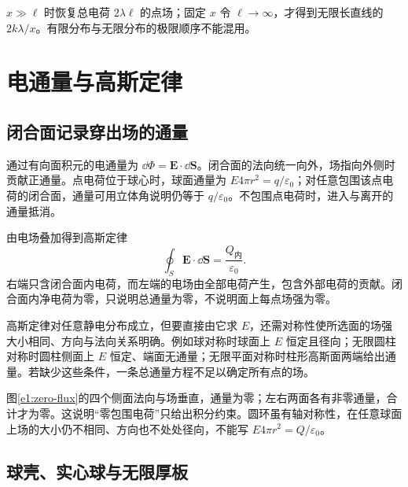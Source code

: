 $x\gg\ell$ 时恢复总电荷 $2\lambda\ell$ 的点场；固定 $x$ 令 $\ell\to\infty$，才得到无限长直线的 $2k\lambda/x$。有限分布与无限分布的极限顺序不能混用。

\section{电通量与高斯定律}
\subsection{闭合面记录穿出场的通量}

通过有向面积元的电通量为 $\dd\Phi=\bm E\cdot\dd\bm S$。闭合面的法向统一向外，场指向外侧时贡献正通量。点电荷位于球心时，球面通量为 $E4\pi r^2=q/\varepsilon_0$；对任意包围该点电荷的闭合面，通量可用立体角说明仍等于 $q/\varepsilon_0$。不包围点电荷时，进入与离开的通量抵消。

由电场叠加得到高斯定律
\[
 \oint_S\bm E\cdot\dd\bm S=\frac{Q_{\text{内}}}{\varepsilon_0}.
\]
右端只含闭合面内电荷，而左端的电场由全部电荷产生，包含外部电荷的贡献。闭合面内净电荷为零，只说明总通量为零，不说明面上每点场强为零。

高斯定律对任意静电分布成立，但要直接由它求 $E$，还需对称性使所选面的场强大小相同、方向与法向关系明确。例如球对称时球面上 $E$ 恒定且径向；无限圆柱对称时圆柱侧面上 $E$ 恒定、端面无通量；无限平面对称时柱形高斯面两端给出通量。若缺少这些条件，一条总通量方程不足以确定所有点的场。


图\ref{e1:zero-flux}的四个侧面法向与场垂直，通量为零；左右两面各有非零通量，合计才为零。这说明“零包围电荷”只给出积分约束。圆环虽有轴对称性，在任意球面上场的大小仍不相同、方向也不处处径向，不能写 $E4\pi r^2=Q/\varepsilon_0$。

\subsection{球壳、实心球与无限厚板}

